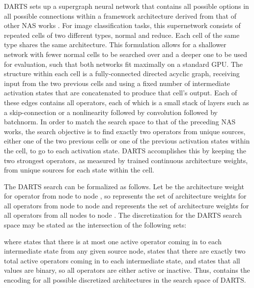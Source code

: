 \documentclass[letterpaper]{article} \usepackage{aaai22}  \usepackage{times}  \usepackage{helvet}  \usepackage{courier}  \usepackage[hyphens]{url}  \usepackage{graphicx} \urlstyle{rm} \def\UrlFont{\rm}  \usepackage{natbib}  \usepackage{caption} \DeclareCaptionStyle{ruled}{labelfont=normalfont,labelsep=colon,strut=off} \frenchspacing  \setlength{\pdfpagewidth}{8.5in}  \setlength{\pdfpageheight}{11in}  \usepackage{algorithm}
\begin{document}
DARTS sets up a supergraph neural network that contains all possible options in all possible connections within a framework architecture derived from that of other NAS works \cite{zoph2017neural,real2019regularized}. For image classification tasks, this supernetwork consists of repeated cells of two different types, normal and reduce. Each cell of the same type shares the same architecture. This formulation allows for a shallower network with fewer normal cells to be searched over and a deeper one to be used for evaluation, such that both networks fit maximally on a standard GPU. The structure within each cell is a fully-connected directed acyclic graph, receiving input from the two previous cells and using a fixed number of intermediate activation states that are concatenated to produce that cell's output. Each of these edges contains all operators, each of which is a small stack of layers such as a skip-connection or a nonlinearity followed by convolution followed by batchnorm. In order to match the search space to that of the preceding NAS works, the search objective is to find exactly two operators from unique sources, either one of the two previous cells or one of the previous activation states within the cell, to go to each activation state. DARTS accomplishes this by keeping the two strongest operators, as measured by trained continuous architecture weights, from unique sources for each state within the cell. 

The DARTS search can be formalized as follows. Let  be the architecture weight for operator  from node  to node , so  represents the set of architecture weights for all operators from node  to node  and  represents the set of architecture weights for all operators from all nodes to node . The discretization for the DARTS search space may be stated as the intersection of the following sets:

where  states that there is at most one active operator coming in to each intermediate state from any given source node,  states that there are exactly two total active operators coming in to each intermediate state, and  states that all  values are binary, so all operators are either active or inactive. Thus,  contains the encoding for all possible discretized architectures  in the search space of DARTS.
\end{document}
